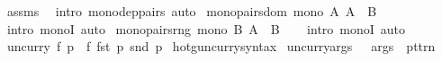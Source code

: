 \begin{isabellebody}
\ assms\ \isamarkupfalse%
\ {\isacharparenleft}{\kern0pt}intro\ mono{\isacharunderscore}{\kern0pt}dep{\isacharunderscore}{\kern0pt}pairs{\isacharparenright}{\kern0pt}\ auto%
\endisatagproof
{\isafoldproof}%
%
\isadelimproof
\isanewline
%
\endisadelimproof
\isanewline
{}\isamarkupfalse%
\ mono{\isacharunderscore}{\kern0pt}pairs{\isacharunderscore}{\kern0pt}dom{\isacharcolon}{\kern0pt}\ {\isachardoublequoteopen}mono\ {\isacharparenleft}{\kern0pt}{\isasymlambda}A{\isachardot}{\kern0pt}\ A\ {\isasymtimes}\ B{\isacharparenright}{\kern0pt}{\isachardoublequoteclose}\isanewline
%
\isadelimproof
\ \ %
\endisadelimproof
%
\isatagproof
{}\isamarkupfalse%
\ {\isacharparenleft}{\kern0pt}intro\ monoI{\isacharparenright}{\kern0pt}\ auto%
\endisatagproof
{\isafoldproof}%
%
\isadelimproof
\isanewline
%
\endisadelimproof
\isanewline
{}\isamarkupfalse%
\ mono{\isacharunderscore}{\kern0pt}pairs{\isacharunderscore}{\kern0pt}rng{\isacharcolon}{\kern0pt}\ {\isachardoublequoteopen}mono\ {\isacharparenleft}{\kern0pt}{\isasymlambda}B{\isachardot}{\kern0pt}\ A\ {\isasymtimes}\ B{\isacharparenright}{\kern0pt}{\isachardoublequoteclose}\isanewline
%
\isadelimproof
\ \ %
\endisadelimproof
%
\isatagproof
{}\isamarkupfalse%
\ {\isacharparenleft}{\kern0pt}intro\ monoI{\isacharparenright}{\kern0pt}\ auto%
\endisatagproof
{\isafoldproof}%
%
\isadelimproof
%
\endisadelimproof
%
\isadelimdocument
%
\endisadelimdocument
%
\isatagdocument
%
\isamarkuptrue%
%
\endisatagdocument
{\isafolddocument}%
%
\isadelimdocument
%
\endisadelimdocument
{}\isamarkupfalse%
\ {\isachardoublequoteopen}uncurry\ f\ p\ {\isasymequiv}\ f\ {\isacharparenleft}{\kern0pt}fst\ p{\isacharparenright}{\kern0pt}\ {\isacharparenleft}{\kern0pt}snd\ p{\isacharparenright}{\kern0pt}{\isachardoublequoteclose}\isanewline
\isanewline
{}\isamarkupfalse%
\ hotg{\isacharunderscore}{\kern0pt}uncurry{\isacharunderscore}{\kern0pt}syntax\isanewline
{}\isanewline
{}\isamarkupfalse%
\ {\isachardoublequoteopen}{\isacharunderscore}{\kern0pt}uncurry{\isacharunderscore}{\kern0pt}args{\isachardoublequoteclose}\ \ {\isacharcolon}{\kern0pt}{\isacharcolon}{\kern0pt}\ {\isachardoublequoteopen}args\ {\isacharequal}{\kern0pt}{\isachargreater}{\kern0pt}\ pttrn{\isachardoublequoteclose}\ {\isacharparenleft}{\kern0pt}{\isachardoublequoteopen}{\isasymlangle}{\isacharunderscore}{\kern0pt}{\isasymrangle}{\isachardoublequoteclose}{\isacharparenright}{\kern0pt}\isanewline

\end{isabellebody}
